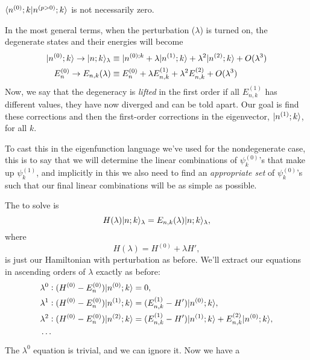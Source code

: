 \ie $\langle n^{(0)};k |n^{(p>0)};k \rangle$ is not necessarily zero.\par
In the most general terms, when the perturbation ($\lambda$) is turned on, 
the degenerate states and their energies will become
\begin{equation}
\begin{aligned}
|n^{(0)};k\rangle\rightarrow|n;k\rangle_{\lambda}&\equiv|n^{(0);k}+\lambda|n^{(1)};k\rangle+\lambda^2|n^{(2)};k\rangle+O(\lambda^3)\\
E_n^{(0)}\rightarrow E_{n,k}(\lambda)&\equiv E_n^{(0)}+\lambda E_{n,k}^{(1)}+\lambda^2 E_{n,k}^{(2)}+O(\lambda^3)
\end{aligned}
\end{equation}
Now, we say that the degeneracy is \textit{lifted} in the first order if all 
$E_{n,k}^{(1)}$ has different values, \ie they have now diverged and can be told apart. 
Our goal is find these corrections and then the first-order corrections in the 
eigenvector, $|n^{(1)};k\rangle $, for all $k$. \par
To cast this in the eigenfunction language we've used for the nondegenerate case, this is 
to say that we will determine the linear combinations of $\psi^{(0)}_k$'s that make up 
$\psi^{(1)}_k$, and implicitly in this we also need to find an 
\textit{appropriate set} of $\psi^{(0)}_k$'s such that our final linear 
combinations will be as simple as possible.\par
The \sch to solve is
\begin{equation}
H(\lambda)|n;k\rangle_{\lambda}=E_{n,k}(\lambda)|n;k\rangle_{\lambda},
\end{equation}
where
\begin{equation}
H(\lambda)=H^{(0)}+\lambda H',
\end{equation}
is just our Hamiltonian with perturbation as before. We'll extract our equations 
in ascending orders of $\lambda$ exactly as before: 
\begin{subequations}
\begin{align}
&\lambda^0:(H^{(0)}-E_n^{(0)})|n^{(0)};k\rangle=0,\\
&\lambda^1:(H^{(0)}-E_n^{(0)})|n^{(1)};k\rangle=(E_{n,k}^{(1)}-H')|n^{(0)};k\rangle ,\\
&\lambda^2:(H^{(0)}-E_n^{(0)})|n^{(2)};k\rangle=(E_{n,k}^{(1)}-H')|n^{(1)};k\rangle+E_{n,k}^{(2)}|n^{(0)};k\rangle,\\
&\cdots\nonumber
\end{align}
\end{subequations}
The $\lambda^0$ equation is trivial, and we can ignore it. Now we have a 
